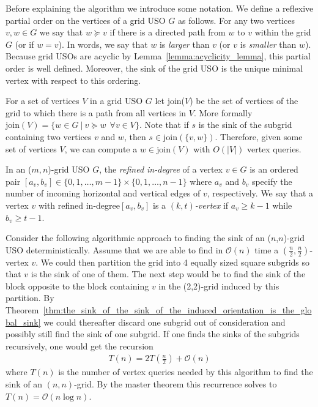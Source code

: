 \documentclass[runningheads,a4paper]{llncs}
\newcommand{\JN}[1]{\marginpar{\parbox{3.6cm}{{\small {\bf JN:} #1}}}} %
\newcommand{\indegree}{refined in-degree\xspace}
\newcommand{\join}{\mbox{join}\xspace}
\begin{document}
Before explaining the algorithm we introduce some notation. We define a reflexive partial order on the vertices of a grid USO $G$ as follows. 
For any two vertices $v,w \in G$ we say that $w \succeq v$ if there is a directed path from $w$ to $v$ within the grid $G$ (or if $w = v$). 
In words, we say that $w$ is \emph{larger} than $v$ (or $v$ is \emph{smaller} than $w$).
Because grid USOs are acyclic by Lemma~\ref{lemma:acyclicity_lemma}, this partial order is well defined.
Moreover, the sink of the grid USO is the unique minimal vertex with respect to this ordering. 

For a set of vertices $V$ in a grid USO $G$ let \join($V$) be the set of vertices of the grid to which there is a path from all vertices in $V$.  More formally $\join(V) = \{w \in G \: | \: v \succeq w \:\: \forall v \in V \}$. Note that if $s$ is the sink of the subgrid containing two vertices $v$ and $w$, then $s \in \join(\{v,w\})$. Therefore, given some set of vertices $V$, we can compute a $w \in \join(V)$ with $O(|V|)$ vertex queries.


In an ($m,n$)-grid USO $G$, the \emph{\indegree} of a vertex $v \in G$ is an ordered pair $[a_v, b_v] \in \{0,1,\ldots,m-1\}\times \{0,1,\ldots,n-1\}$ where $a_v$ and $b_v$ specify the number of incoming horizontal  and vertical edges of $v$, respectively.
We say that a vertex $v$ with \indegree $[a_v, b_v]$ is a \emph{$(k, t)$-vertex} if $a_v\geq k-1$ while $b_v\geq t-1$.

Consider the following algorithmic approach to finding the sink of an ($n$,$n$)-grid USO deterministically. 
Assume that we are able to find in $\mathcal{O}(n)$ time a $(\frac{n}{2}, \frac{n}{2})$-vertex $v$.
We could then partition the grid into 4 equally sized square subgrids so that $v$ is the sink of one of them.
The next step would be to find the sink of the block opposite to the block containing $v$ in the (2,2)-grid induced by this partition. 
By Theorem~\ref{thm:the_sink_of_the_sink_of_the_induced_orientation_is_the_global_sink} we could thereafter discard one subgrid out of consideration and possibly still find the sink of one subgrid.
If one finds the sinks of the subgrids recursively, one would get the recursion
\begin{align*}
 T(n) = 2T\left(\frac{n}{2}\right) + \mathcal{O}(n)
\end{align*}
where $T(n)$ is the number of vertex queries needed by this algorithm to find the sink of an $(n,n)$-grid. By the master theorem this recurrence solves to $T(n) = \mathcal{O}(n\log n)$. 
\end{document}
